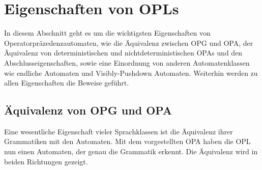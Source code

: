 \section{Eigenschaften von OPLs}
In diesem Abschnitt geht es um die wichtigsten Eigenschaften von Operatorpräzedenzautomaten, wie die Äquivalenz zwischen OPG und OPA, der Äquivalenz von deterministischen und nichtdeterministischen OPAs und den Abschlusseigenschaften, sowie eine Einordnung von anderen Automatenklassen wie endliche Automaten und Visibly-Pushdown Automaten. Weiterhin werden zu allen Eigenschaften die Beweise geführt.
\subsection{Äquivalenz von OPG und OPA}
Eine wesentliche Eigenschaft vieler Sprachklassen ist die Äquivalenz ihrer Grammatiken mit den Automaten. Mit dem vorgestellten OPA haben die OPL nun einen Automaten, der genau die Grammatik erkennt. Die Äquivalenz wird in beiden Richtungen gezeigt.

